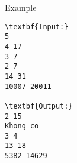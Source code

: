 Example
\begin{verbatim}
\textbf{Input:}
5
4 17
3 7
2 7
14 31
10007 20011

\textbf{Output:}
2 15
Khong co
3 4
13 18
5382 14629
\end{verbatim}